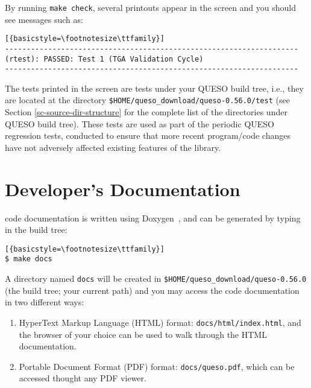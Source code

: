 
By running \texttt{make check}, several printouts appear in the screen and you should see messages such as:
\begin{lstlisting}[{basicstyle=\footnotesize\ttfamily}]
--------------------------------------------------------------------
(rtest): PASSED: Test 1 (TGA Validation Cycle)
--------------------------------------------------------------------
\end{lstlisting}

The tests printed in  the screen are tests under your QUESO build tree, i.e., they are located at the  directory \verb+$HOME/queso_download/queso-0.56.0/test+ (see Section \ref{sc-source-dir-structure} for the complete list of the directories under QUESO build tree).    
These tests are used as part of the periodic QUESO regression tests, conducted to ensure that more recent program/code changes have not adversely affected existing features of the library.



\section{\Queso{} Developer's Documentation}\label{sec:Queso_docs}



\Queso{} code documentation is written using Doxygen~\cite{Doxygen}, and can be generated by typing in the build tree:
\begin{lstlisting}[{basicstyle=\footnotesize\ttfamily}]
$ make docs
\end{lstlisting}

A directory named \verb+docs+ will be created in \verb+$HOME/queso_download/queso-0.56.0+ (the build tree; your current path) and you may access the code documentation in two different ways:
\begin{enumerate}
 \item HyperText Markup Language (HTML)  format: \verb+docs/html/index.html+, and the browser of your choice can be used to walk through the HTML documentation.

\item Portable Document Format (PDF) format: \verb+docs/queso.pdf+, which can be accessed thought any PDF viewer.
\end{enumerate}
% 

